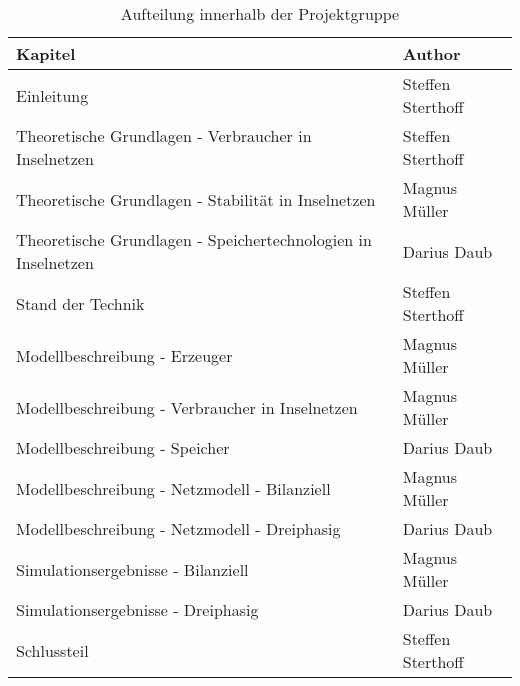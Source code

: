 \begin{table}
	\begin{tabular}[htpb]{p{8cm}|p{3cm}}
		\textbf{Kapitel} & \textbf{Author} \\
		\hline
		Einleitung & Steffen Sterthoff \\
		Theoretische Grundlagen - Verbraucher in Inselnetzen & Steffen Sterthoff \\
		Theoretische Grundlagen - Stabilität in Inselnetzen & Magnus Müller \\
		Theoretische Grundlagen - Speichertechnologien in Inselnetzen & Darius Daub \\
		Stand der Technik & Steffen Sterthoff \\
		Modellbeschreibung - Erzeuger & Magnus Müller \\
		Modellbeschreibung - Verbraucher in Inselnetzen & Magnus Müller \\
		Modellbeschreibung - Speicher & Darius Daub \\
		Modellbeschreibung - Netzmodell - Bilanziell & Magnus Müller \\
		Modellbeschreibung - Netzmodell - Dreiphasig & Darius Daub \\
		Simulationsergebnisse - Bilanziell & Magnus Müller \\
		Simulationsergebnisse - Dreiphasig & Darius Daub \\
		Schlussteil & Steffen Sterthoff		
	\end{tabular}
 	\centering
	\caption{Aufteilung innerhalb der Projektgruppe}
	\label{tab:Aufteilung}
\end{table}
